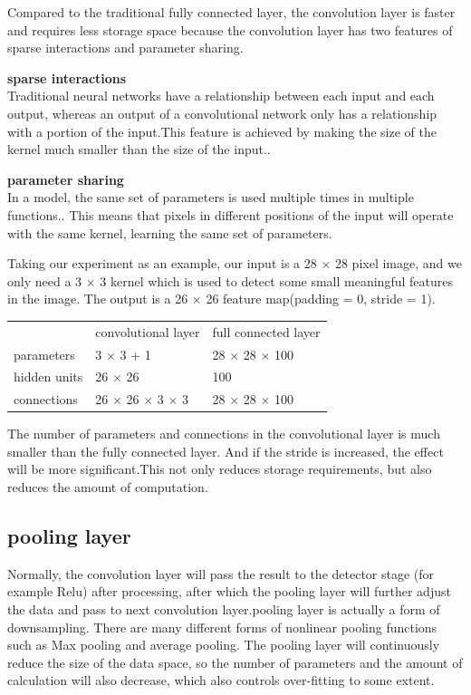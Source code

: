 \documentclass{article}
\begin{document}
Compared to the traditional fully connected layer, the convolution layer is faster and requires less storage space because the convolution layer has two features of sparse interactions and parameter sharing.

\textbf{sparse interactions}\\
Traditional neural networks have a relationship between each input and each output, whereas an output of a convolutional network only has a relationship with a portion of the input.This feature is achieved by making the size of the kernel much smaller than the size of the input.\cite{deeplearning2016}.

\textbf{parameter sharing}\\
In a model, the same set of parameters is used multiple times in multiple functions.\cite{deeplearning2016}.
This means that pixels in different positions of the input will operate with the same kernel, learning the same set of parameters.

Taking our experiment as an example, our input is a 28 $\times$ 28 pixel image, and we only need a 3 $\times$ 3 kernel which is used to detect some small meaningful features in the image. The output is a 26 $\times$ 26 feature map(padding = 0, stride = 1).

\begin{table}[H]
  \centering
    \begin{tabular}{lll}
          & convolutional layer & full connected layer \\
    parameters & 3 $\times$ 3 + 1  & 28 $\times$ 28 $\times$ 100  \\
    hidden units & 26 $\times$ 26 & 100 \\
    connections & 26 $\times$ 26 $\times$ 3 $\times$ 3 & 28 $\times$ 28 $\times$ 100 \\
    \end{tabular}%
  \label{clayertable1}
\end{table}%
The number of parameters and connections in the convolutional layer is much smaller than the fully connected layer. And if the stride is increased, the effect will be more significant.This not only reduces storage requirements, but also reduces the amount of computation.
\subsection{pooling layer}
Normally, the convolution layer will pass the result to the detector stage (for example Relu) after processing, after which the pooling layer will further adjust the data and pass to next convolution layer.pooling layer is actually a form of downsampling. There are many different forms of nonlinear pooling functions such as Max pooling and average pooling. The pooling layer will continuously reduce the size of the data space, so the number of parameters and the amount of calculation will also decrease, which also controls over-fitting to some extent.
\end{document}
